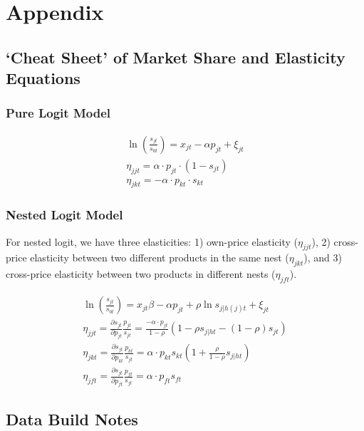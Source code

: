 \documentclass{article}
\begin{document}
\section{Appendix}

\subsection{`Cheat Sheet' of Market Share and Elasticity Equations}

\subsubsection{Pure Logit Model}

\begin{gather}
	\ln(\frac{s_{jt}}{s_{0t}}) = x_{jt} - \alpha p_{jt} + \xi_{jt} \\
	\eta_{jjt} =  \alpha \cdot p_{jt} \cdot (1 - s_{jt}) \\
	\eta_{jkt} = -\alpha \cdot p_{kt} \cdot s_{kt}
\end{gather}

\subsubsection{Nested Logit Model}

For nested logit, we have three elasticities: 1) own-price elasticity ($\eta_{jjt}$), 2) cross-price elasticity between two different products in the same nest ($\eta_{jkt}$), and 3) cross-price elasticity between two products in different nests ($\eta_{jft}$).

\begin{gather}
	\ln(\frac{s_{jt}}{s_{0t}}) = x_{jt} \beta - \alpha p_{jt} + \rho \ln s_{j | h(j) t} + \xi_{jt} \\
	\eta_{jjt} = \frac{\partial s_{jt}}{\partial p_{jt}}\frac{p_{jt}}{s_{jt}} = \frac{-\alpha \cdot p_{jt}}{1 - \rho}(1 - \rho s_{j | h t} - (1 - \rho)s_{jt}) \\
	\eta_{jkt} = \frac{\partial s_{jt}}{\partial p_{kt}}\frac{p_{kt}}{s_{jt}} = \alpha \cdot p_{kt} s_{kt} (1 + \frac{\rho}{1 - \rho} s_{j | h t}) \\  
	\eta_{jft} = \frac{\partial s_{jt}}{\partial p_{ft}}\frac{p_{ft}}{s_{jt}} = \alpha \cdot p_{ft} s_{ft}
\end{gather}

\subsection{Data Build Notes}
\end{document}
